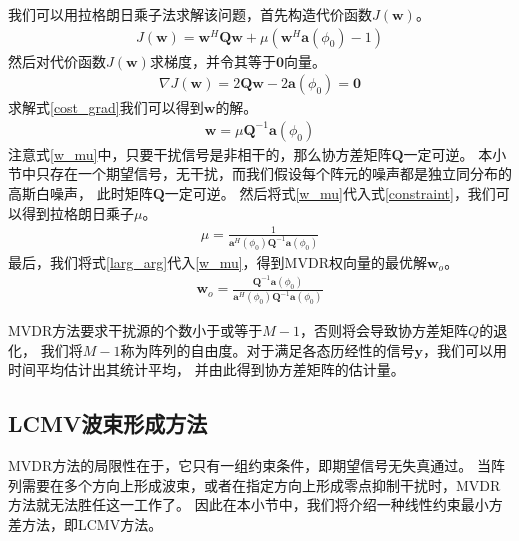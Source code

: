 \documentclass[master]{thesis-uestc}
\begin{document}
我们可以用拉格朗日乘子法求解该问题，首先构造代价函数$J(\bm{w})$。
\begin{equation}
    \begin{aligned}
    J(\bm{w}) = \bm{w}^H\bm{Q}\bm{w} + \mu\left(\bm{w}^H\bm{a}(\phi_0)-1\right)
    \end{aligned}
\end{equation}
然后对代价函数$J(\bm{w})$求梯度，并令其等于$\textbf{0}$向量。
\begin{equation}\label{cost_grad}
    \begin{aligned}
    \nabla J(\bm{w}) = 2\bm{Q}\bm{w} - 2\bm{a}(\phi_0) = \textbf{0}
    \end{aligned}
\end{equation}
求解式\eqref{cost_grad}我们可以得到$\bm{w}$的解。
\begin{equation}\label{w_mu}
    \begin{aligned}
    \bm{w} = \mu\bm{Q}^{-1}\bm{a}(\phi_0)
    \end{aligned}
\end{equation}
注意式\eqref{w_mu}中，只要干扰信号是非相干的，那么协方差矩阵$\bm{Q}$一定可逆。
本小节中只存在一个期望信号，无干扰，而我们假设每个阵元的噪声都是独立同分布的高斯白噪声，
此时矩阵$\bm{Q}$一定可逆。
然后将式\eqref{w_mu}代入式\eqref{constraint}，我们可以得到拉格朗日乘子$\mu$。
\begin{equation}\label{larg_arg}
    \begin{aligned}
    \mu = \frac{1}{\bm{a}^H(\phi_0)\bm{Q}^{-1}\bm{a}(\phi_0)}
    \end{aligned}
\end{equation}
最后，我们将式\eqref{larg_arg}代入\eqref{w_mu}，得到MVDR权向量的最优解$\bm{w}_o$。
\begin{equation}\label{w_solve}
    \begin{aligned}
    \bm{w}_o = \frac{\bm{Q}^{-1}\bm{a}(\phi_0)}{\bm{a}^H(\phi_0)\bm{Q}^{-1}\bm{a}(\phi_0)}
    \end{aligned}
\end{equation}

MVDR方法要求干扰源的个数小于或等于$M-1$，否则将会导致协方差矩阵$Q$的退化，
我们将$M-1$称为阵列的自由度。对于满足各态历经性的信号$\bm{y}$，我们可以用时间平均估计出其统计平均，
并由此得到协方差矩阵的估计量。

\subsection{LCMV波束形成方法}
MVDR方法的局限性在于，它只有一组约束条件，即期望信号无失真通过。
当阵列需要在多个方向上形成波束，或者在指定方向上形成零点抑制干扰时，MVDR方法就无法胜任这一工作了。
因此在本小节中，我们将介绍一种线性约束最小方差方法，即LCMV方法。
\end{document}
